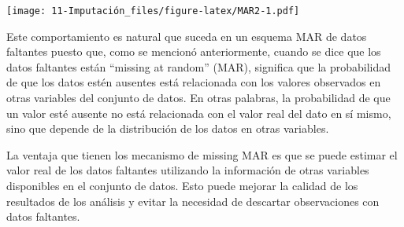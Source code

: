 \documentclass[
  12pt,
]{book}
\newenvironment{Shaded}{\begin{snugshade}}{\end{snugshade}}
\newcommand{\AttributeTok}[1]{\textcolor[rgb]{0.77,0.63,0.00}{#1}}
\newcommand{\FloatTok}[1]{\textcolor[rgb]{0.00,0.00,0.81}{#1}}
\newcommand{\FunctionTok}[1]{\textcolor[rgb]{0.00,0.00,0.00}{#1}}
\newcommand{\NormalTok}[1]{#1}
\newcommand{\OtherTok}[1]{\textcolor[rgb]{0.56,0.35,0.01}{#1}}
\newcommand{\SpecialCharTok}[1]{\textcolor[rgb]{0.00,0.00,0.00}{#1}}
\newcommand{\StringTok}[1]{\textcolor[rgb]{0.31,0.60,0.02}{#1}}
\begin{document}
\begin{Shaded}
\end{Shaded}

\texttt{[image: 11-Imputación\_files/figure-latex/MAR2-1.pdf]}

Este comportamiento es natural que suceda en un esquema MAR de datos faltantes puesto que, como se mencionó anteriormente, cuando se dice que los datos faltantes están ``missing at random'' (MAR), significa que la probabilidad de que los datos estén ausentes está relacionada con los valores observados en otras variables del conjunto de datos. En otras palabras, la probabilidad de que un valor esté ausente no está relacionada con el valor real del dato en sí mismo, sino que depende de la distribución de los datos en otras variables.

La ventaja que tienen los mecanismo de missing MAR es que se puede estimar el valor real de los datos faltantes utilizando la información de otras variables disponibles en el conjunto de datos. Esto puede mejorar la calidad de los resultados de los análisis y evitar la necesidad de descartar observaciones con datos faltantes.
\end{document}
